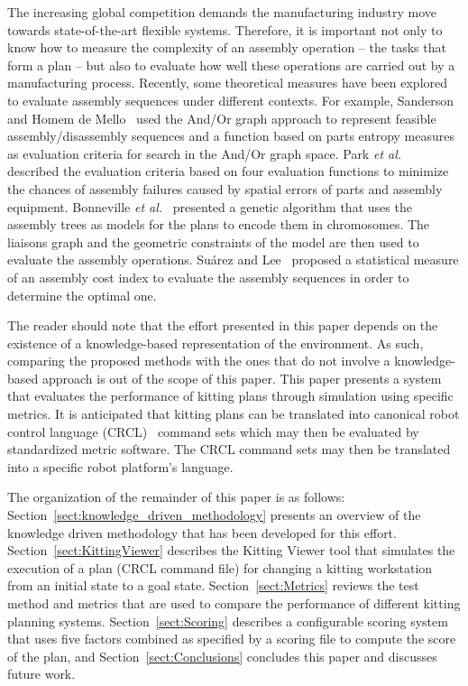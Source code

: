 The increasing global competition demands the manufacturing industry move towards state-of-the-art flexible systems. Therefore, it is important
not only to know how to measure the complexity of an assembly operation --
the tasks that form a plan -- but also to evaluate how well these
operations are carried out by a manufacturing process. Recently, some
theoretical measures have been explored to evaluate assembly sequences
under different contexts. For example, Sanderson and Homem de
Mello~\cite{SANDERSON.1987} used the And/Or graph approach to represent
feasible assembly/disassembly sequences and a function based on parts
entropy measures as evaluation criteria for search in the And/Or graph
space. Park \textit{et al.}~\cite{PARK.1991} described the evaluation
criteria based on four evaluation functions to minimize the chances of
assembly failures caused by spatial errors of parts and assembly equipment.
Bonneville \textit{et al.}~\cite{BONNEVILLE.1995} presented a genetic
algorithm that uses the assembly trees as models for the plans to encode
them in chromosomes. The liaisons graph and the geometric constraints of
the model are then used to evaluate the assembly operations. Su\'{a}rez and
Lee~\cite{SUAREZ.1997} proposed a statistical measure of an assembly cost
index to evaluate the assembly sequences in order to determine the optimal
one.


The reader should note that the effort presented in this paper depends on the existence of a knowledge-based representation of the environment. As such, comparing the proposed methods with the ones that do not involve a knowledge-based approach is out of the scope of this paper. This paper presents a system that evaluates the performance of kitting plans through simulation using specific metrics.  It is anticipated that kitting
plans can be translated into canonical robot control language
(CRCL)~\cite{NISTIR.Balakirsky} command sets which may then be evaluated
by standardized metric software. The CRCL command sets may then be
translated into a specific robot platform's language.

The organization of the remainder of this paper is as follows:
Section~\ref{sect:knowledge_driven_methodology} presents an overview of the
knowledge driven methodology that has been developed for this effort.
Section~\ref{sect:KittingViewer} describes the Kitting Viewer tool that
simulates the execution of a plan (CRCL command file) for changing a
kitting workstation from an initial state to a goal state.
Section~\ref{sect:Metrics} reviews the test method and metrics that are
used to compare the performance of different kitting planning systems.
Section~\ref{sect:Scoring} describes a configurable scoring system that
uses five factors combined as specified by a scoring file to compute the
score of the plan, and Section~\ref{sect:Conclusions} concludes this paper
and discusses future work.


